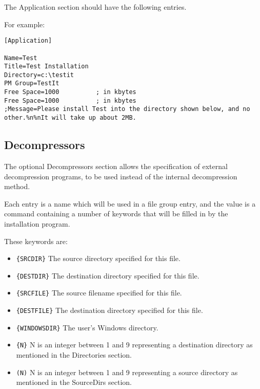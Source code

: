 The Application section should have the following entries.


For example:

\begin{verbatim}
[Application]

Name=Test
Title=Test Installation
Directory=c:\testit
PM Group=TestIt
Free Space=1000          ; in kbytes
Free Space=1000          ; in kbytes
;Message=Please install Test into the directory shown below, and no other.%n%nIt will take up about 2MB.
\end{verbatim}

\subsection{Decompressors}\label{decompressors}

The optional Decompressors section allows the specification of external
decompression programs, to be used instead of the internal
decompression method.

Each entry is a name which will be used in a file group entry,
and the value is a command containing a number of keywords
that will be filled in by the installation program.

These keywords are:

\begin{itemize}\itemsep=0pt
\item \verb${SRCDIR}$ The source directory specified for this file.
\item \verb${DESTDIR}$ The destination directory specified for this file.
\item \verb${SRCFILE}$ The source filename specified for this file.
\item \verb${DESTFILE}$ The destination directory specified for this file.
\item \verb${WINDOWSDIR}$ The user's Windows directory.
\item \verb${N}$ N is an integer between 1 and 9 representing a
destination directory as mentioned in the Directories section.
\item \verb$(N)$ N is an integer between 1 and 9 representing a
source directory as mentioned in the SourceDirs section.
\end{itemize}

